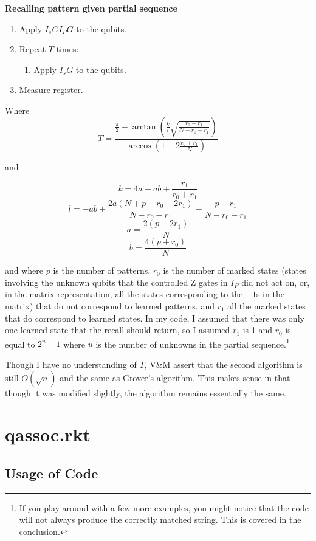 \documentclass[11pt]{article}
\begin{document}
\begin{framed}
\textbf{Recalling pattern given partial sequence }
\begin{enumerate}
	\item Apply $I_sGI_PG$ to the qubits.
	\item Repeat $T$ times:
	\begin{enumerate}
		\item Apply $I_sG$ to the qubits.
	\end{enumerate}
	\item Measure register.
\end{enumerate}
\end{framed}

Where $$T=\frac{\frac{\pi}{2}-\arctan \left (\frac{k}{l}\sqrt{\frac{r_0+r_1}{N-r_0-r_1}} \right )}{\arccos \left ( 1-2\frac{r_0+r_1}{N} \right )}$$

and

$$k=4a-ab+\frac{r_1}{r_0+r_1}$$
$$l=-ab+\frac{2a(N+p-r_0-2r_1)}{N-r_0-r_1}-\frac{p-r_1}{N-r_0-r_1}$$
$$a=\frac{2(p-2r_1)}{N}$$
$$b=\frac{4(p+r_0)}{N}$$

and where $p$ is the number of patterns, $r_0$ is the number of marked states (states involving the unknown qubits that the controlled Z gates in $I_P$ did not act on, or, in the matrix representation, all the states corresponding to the $-1$s in the matrix) that do not correspond to learned patterns, and $r_1$ all the marked states that do correspond to learned states. In my code, I assumed that there was only one learned state that the recall should return, so I assumed $r_1$ is 1 and $r_0$ is equal to $2^u-1$ where $u$ is the number of unknowns in the partial sequence.\footnote{If you play around with a few more examples, you might notice that the code will not always produce the correctly matched string. This is covered in the conclusion.}

Though I have no understanding of $T$, V\&M assert that the second algorithm is still $O(\sqrt{n})$ and the same as Grover's algorithm. This makes sense in that though it was modified slightly, the algorithm remains essentially the same.

\section{qassoc.rkt}



\subsection{Usage of Code}
\end{document}
